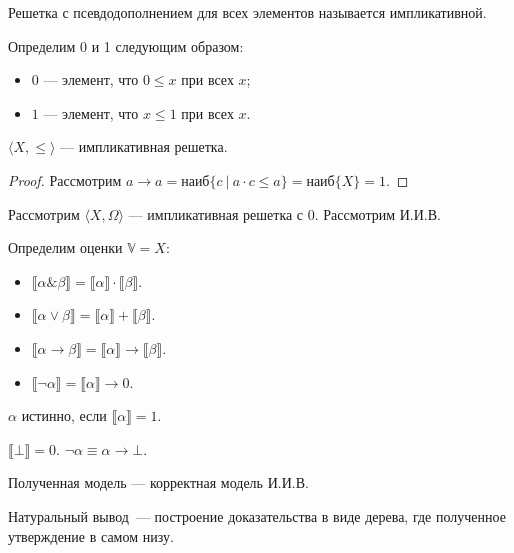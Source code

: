 \begin{definition}
    Решетка с псевдодополнением для всех элементов называется импликативной.
\end{definition}

\begin{definition} Определим 0 и 1 следующим образом:
    \begin{itemize}
        \item $0$ --- элемент, что $0 \leqslant x $ при всех $x$;
        \item $1$ --- элемент, что $x \leqslant 1 $ при всех $x$.
    \end{itemize}
\end{definition}

\begin{theorem}
     $\langle X, \leqslant \rangle$ --- импликативная решетка.
\end{theorem}
\begin{proof}
    Рассмотрим $a \to a= \text{наиб} \{ c ~|~ a \cdot c \leqslant a\} = \text{наиб} \{ X \} = 1$.
\end{proof}

\begin{theorem}
    Рассмотрим $\langle X, \Omega \rangle$ --- импликативная решетка с $0$. Рассмотрим И.И.В.


    Определим оценки $\mathbb{V}  = X$:
    \begin{itemize}
        \item     $\llbracket \alpha \& \beta \rrbracket = \llbracket\alpha \rrbracket \cdot \llbracket\beta \rrbracket$.
        \item     $\llbracket \alpha \vee \beta \rrbracket = \llbracket\alpha \rrbracket + \llbracket\beta \rrbracket$.
        \item     $\llbracket \alpha \to \beta \rrbracket = \llbracket\alpha \rrbracket \to \llbracket\beta \rrbracket$.
        \item     $\llbracket \neg \alpha \rrbracket = \llbracket\alpha \rrbracket \to 0$.
    \end{itemize}

    $\alpha$ истинно, если $\llbracket \alpha \rrbracket = 1$.

    $\llbracket\bot \rrbracket = 0$.
    $\neg \alpha \equiv \alpha \to \bot$.

    Полученная модель --- корректная модель И.И.В.
\end{theorem}

\begin{definition}
    Натуральный вывод~--- построение доказательства в виде дерева, где полученное утверждение в самом низу.
\end{definition}

